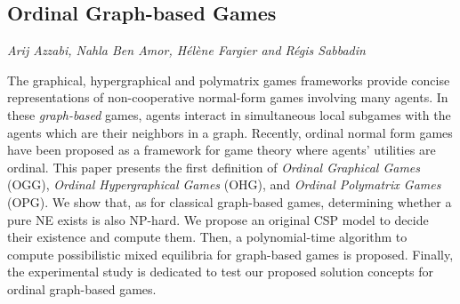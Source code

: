 \documentclass[../booklet.tex]{subfiles}
\begin{document}
\subsection[Ordinal Graph-based Games. {\it Arij Azzabi, Nahla Ben Amor, Hélène Fargier and Régis Sabbadin}]{Ordinal Graph-based Games}
   

\begin{center}
  {\it Arij Azzabi, Nahla Ben Amor, Hélène Fargier and Régis Sabbadin}
\end{center}


 
 The graphical, hypergraphical and polymatrix games frameworks provide concise representations of non-cooperative normal-form games involving many agents. In these {\em graph-based} games, agents interact in simultaneous local subgames with the agents which are their neighbors in a graph. 
Recently, ordinal normal form games have been proposed as a framework for game theory where agents' utilities are ordinal. 
This paper presents the first definition of \emph{Ordinal Graphical Games} (OGG),  \emph{Ordinal Hypergraphical Games} (OHG), and \emph{Ordinal Polymatrix Games} (OPG). 
We show that, as for classical graph-based games, determining whether a pure NE exists is also NP-hard. We propose an original CSP model to decide their existence and compute them.
Then, a polynomial-time algorithm to compute possibilistic mixed equilibria for graph-based games is proposed. Finally, the experimental study is dedicated to test our proposed solution concepts for ordinal graph-based games.

\end{document}
